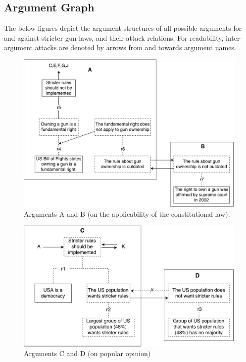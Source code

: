\documentclass[]{article}
\begin{document}
\subsection{Argument Graph}
The below figures depict the argument structures of all possible arguments for and against stricter gun laws, and their attack relations. For readability, inter-argument attacks are denoted by arrows from and towards argument names.

\begin{figure}
\includegraphics[scale=0.5]{images/AB.pdf}
\caption{Arguments A and B (on the applicability of the constitutional law).}
\end{figure}
\begin{figure}
\includegraphics[scale=0.5]{images/CD.pdf}
\caption{Arguments C and D (on popular opinion)}
\end{figure}
\end{document}
